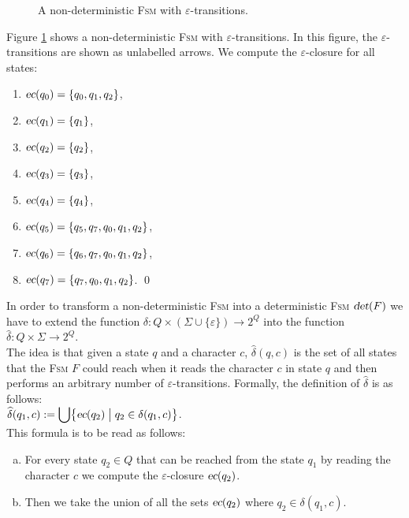 \begin{figure}[!ht]
  \centering

   \caption{A non-deterministic \textsc{Fsm} with $\varepsilon$-transitions.}
  \label{fig:ab-or-ba-star.dot}
\end{figure}

\exampleEng
Figure \ref{fig:ab-or-ba-star.dot} shows a non-deterministic \textsc{Fsm} with 
$\varepsilon$-transitions.   In this figure, the $\varepsilon$-transitions are shown as unlabelled arrows.
We compute the $\varepsilon$-closure for all states:
\begin{enumerate}
\item $\textsl{ec}(q_0) = \{ q_0, q_1, q_2 \}$,
\item $\textsl{ec}(q_1) = \{ q_1 \}$,
\item $\textsl{ec}(q_2) = \{ q_2 \}$,
\item $\textsl{ec}(q_3) = \{ q_3 \}$,
\item $\textsl{ec}(q_4) = \{ q_4 \}$,
\item $\textsl{ec}(q_5) = \{ q_5, q_7, q_0, q_1, q_2 \}$,
\item $\textsl{ec}(q_6) = \{ q_6, q_7, q_0, q_1, q_2 \}$,
\item $\textsl{ec}(q_7) = \{ q_7, q_0, q_1, q_2 \}$.
      \qed
\end{enumerate}

\noindent
In order to transform a non-deterministic \textsc{Fsm} into a deterministic \textsc{Fsm}
$\textsl{det}(F)$ we have to extend the function $\delta:Q  \times (\Sigma \cup \{\varepsilon\}) \rightarrow 2^Q$ into the function
\\[0.2cm]
\hspace*{1.3cm}
$\widehat{\delta}: Q \times \Sigma \rightarrow 2^Q$.
\\[0.2cm]
The idea is that given a state $q$ and a character $c$,  $\widehat{\delta}(q,c)$ is the set of all states that the
\textsc{Fsm} $F$ could reach when it reads the character $c$ in state $q$ and then performs an arbitrary number
of $\varepsilon$-transitions.  Formally, the definition of $\widehat{\delta}$ is as follows:
\\[0.2cm]
\hspace*{1.3cm}
$\displaystyle \widehat{\delta}(q_1, c) := \bigcup \bigl\{ \textsl{ec}(q_2) \bigm| q_2 \in \delta(q_1, c) \bigr \}$.
\\[0.2cm]
This formula is to be read as follows:
\begin{enumerate}[(a)]
\item For every state $q_2 \in Q$ that can be reached from the state $q_1$ by reading the character $c$ we
      compute the $\varepsilon$-closure $\textsl{ec}(q_2)$.
\item Then we take the union of all the sets $\textsl{ec}(q_2)$ where $q_2 \in \delta(q_1, c)$.
\end{enumerate}

